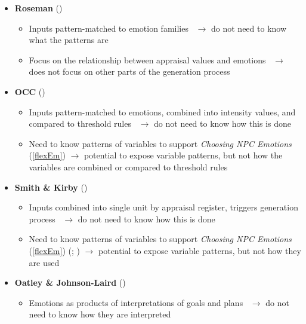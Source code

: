 \begin{itemize}
    \item \textbf{Roseman} (\good)
    \begin{itemize}
        \item Inputs pattern-matched to emotion families~\citep[p.~70--71,
        81]{roseman2001model} $\rightarrow$ do not need to know what the
        patterns are

        \item Focus on the relationship between appraisal values and
        emotions~\citep[p.~81]{roseman2001model} $\rightarrow$ does not focus
        on other parts of the generation process
    \end{itemize}

    \item \textbf{OCC} (\good)
    \begin{itemize}
        \item Inputs pattern-matched to emotions, combined into intensity
        values, and compared to threshold rules~\citep[p.~69, 189]{occ}
        $\rightarrow$ do not need to know how this is done

        \item Need to know patterns of variables to support \textit{Choosing
            NPC Emotions} (\ref{flexEm}) $\rightarrow$ potential to expose
            variable
        patterns, but not how the variables are combined or compared to
        threshold rules
    \end{itemize}

    \item \textbf{Smith \& Kirby} (\good)
    \begin{itemize}
        \item Inputs combined into single unit by appraisal
        register, triggers generation process~\citep[p.~130]{smith2001toward}
        $\rightarrow$ do not need to know how this is done

        \item Need to know patterns of variables to support \textit{Choosing
            NPC Emotions} (\ref{flexEm}) (;
        ) $\rightarrow$ potential to expose variable
        patterns, but not how they are used
    \end{itemize}

    \item \textbf{Oatley \& Johnson-Laird} (\good)
    \begin{itemize}
        \item Emotions as products of interpretations of goals and
        plans~\citep[p.~30]{oatley1987towards} $\rightarrow$ do not need to
        know how they are interpreted


\end{itemize}
\end{itemize}
